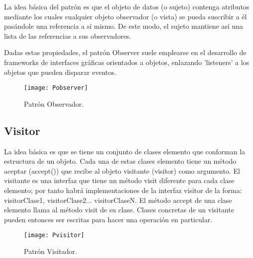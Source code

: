 La idea básica del patrón es que el objeto de datos (o sujeto) contenga atributos mediante los cuales cualquier objeto observador (o vista) se pueda suscribir a él pasándole una referencia a sí mismo. De este modo, el sujeto mantiene así una lista de las referencias a sus observadores.

Dadas estas propiedades, el patrón Observer suele emplearse en el desarrollo de frameworks de interfaces gráficas orientados a objetos, enlazando 'listeners' a los objetos que pueden disparar eventos.

\begin{figure}[H]
\centering
\texttt{[image: Pobserver]}
\caption{Patrón Observador.}
\end{figure}

\subsection{Visitor}

La idea básica es que se tiene un conjunto de clases elemento que conforman la estructura de un objeto. Cada una de estas clases elemento tiene un método aceptar (accept()) que recibe al objeto visitante (visitor) como argumento. El visitante es una interfaz que tiene un método visit diferente para cada clase elemento; por tanto habrá implementaciones de la interfaz visitor de la forma: visitorClase1, visitorClase2... visitorClaseN. El método accept de una clase elemento llama al método visit de su clase. Clases concretas de un visitante pueden entonces ser escritas para hacer una operación en particular.

\begin{figure}[H]
\centering
\texttt{[image: Pvisitor]}
\caption{Patrón Visitador.}
\end{figure}